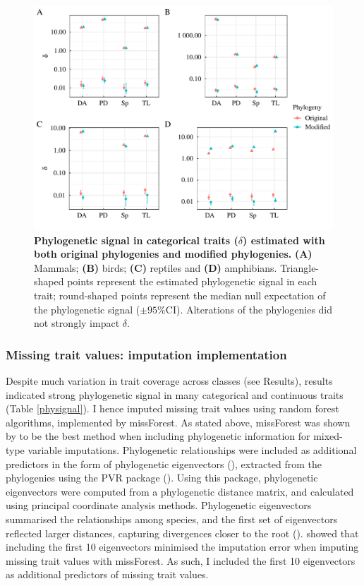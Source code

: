 \begin{figure}[h!]
\centering
\includegraphics[scale=0.5]{figures/chapter2/Phylosignal/Categorical}
\caption[Phylogenetic signal in categorical traits ($\delta$) estimated with both original phylogenies and modified phylogenies]{\textbf{Phylogenetic signal in categorical traits ($\delta$) estimated with both original phylogenies and modified phylogenies.} \textbf{(A)} Mammals; \textbf{(B)} birds; \textbf{(C)} reptiles and \textbf{(D)} amphibians. Triangle-shaped points represent the estimated phylogenetic signal in each trait; round-shaped points represent the median null expectation of the phylogenetic signal ($\pm95\%$CI). Alterations of the phylogenies did not strongly impact $\delta$.}
\label{signalcategorical}
\end{figure}

\pagebreak


\subsubsection{Missing trait values: imputation implementation}
Despite much variation in trait coverage across classes (see Results), results indicated strong phylogenetic signal in many categorical and continuous traits (Table \ref{physignal}).
I hence imputed missing trait values using random forest algorithms, implemented by missForest. As stated above, missForest was shown by \cite{Penone2014} to be the best method when including phylogenetic information for mixed-type variable imputations. Phylogenetic relationships were included as additional predictors in the form of phylogenetic eigenvectors (\cite{Diniz-Filho2012}), extracted from the phylogenies using the PVR package (\cite{Santos2018}). Using this package, phylogenetic eigenvectors were computed from a phylogenetic distance matrix, and calculated using principal coordinate analysis methods. Phylogenetic eigenvectors summarised the relationships among species, and the first set of eigenvectors reflected larger distances, capturing divergences closer to the root (\cite{Diniz-Filho2012}). \cite{Penone2014} showed that including the first 10 eigenvectors minimised the imputation error when imputing missing trait values with missForest. As such, I included the first 10 eigenvectors as additional predictors of missing trait values.   

